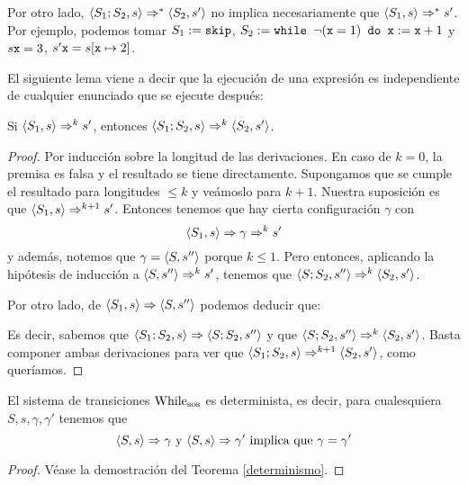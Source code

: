 \begin{example}
Por otro lado, $\la{S_1;S_2}{s}\dto^* \la{S_2}{s'}$ no implica necesariamente que $\la{S_1}{s}\dto^* s'$. Por ejemplo, podemos tomar $S_1 := \n{skip}$, $S_2 := \n{while }\neg(\n{x}=1)\n{ do } \n{x}:=\n{x}+1$ y $s\n{x} = 3$, $s'\n{x} = s[\n{x}\mapsto 2]$.
\end{example}


El siguiente lema viene a decir que la ejecución de una expresión es independiente de cualquier enunciado que se ejecute después:

\begin{lema}\label{lemasos2}
Si $\la{S_1}{s}\dto^k s'$, entonces $\la{S_1;S_2}{s}\dto^k \la{S_2}{s'}$.
\end{lema}
\begin{proof}
Por inducción sobre la longitud de las derivaciones. En caso de $k=0$, la premisa es falsa y el resultado se tiene directamente. Supongamos que se cumple el resultado para longitudes $\leq k$ y veámoslo para $k+1$. Nuestra suposición es que $\la{S_1}{s}\dto^{k+1} s'$. Entonces tenemos que hay cierta configuración $\gamma$ con 
$$\la{S_1}{s}\dto \gamma \dto^k s'$$
y además, notemos que $\gamma = \la{S}{s''}$ porque $k\leq 1$. Pero entonces, aplicando la hipótesis de inducción a $\la{S}{s''} \dto^k s'$, tenemos que $\la{S;S_2}{s''}\dto^k \la{S_2}{s'}$. 

Por otro lado, de $\la{S_1}{s}\dto \la{S}{s''}$ podemos deducir que:
\begin{prooftree}
\end{prooftree}
Es decir, sabemos que $\la{S_1; S_2}{s} \dto \la{S; S_2}{s''}$ y que $\la{S;S_2}{s''}\dto^k \la{S_2}{s'}$. Basta componer ambas derivaciones para ver que $\la{S_1; S_2}{s}\dto^{k+1} \la{S_2}{s'}$, como queríamos.
\end{proof}

\begin{theorem}\label{teosos}
El sistema de transiciones $\nn{While}_\nn{sos}$ es determinista, es decir, para cualesquiera $S, s, \gamma, \gamma'$ tenemos que
$$\la{S}{s}\dto \gamma \text{ y } \la{S}{s}\dto \gamma' \text{ implica que } \gamma = \gamma'$$
\end{theorem}
\begin{proof}
Véase la demostración del Teorema \ref{determinismo}.
\end{proof}

